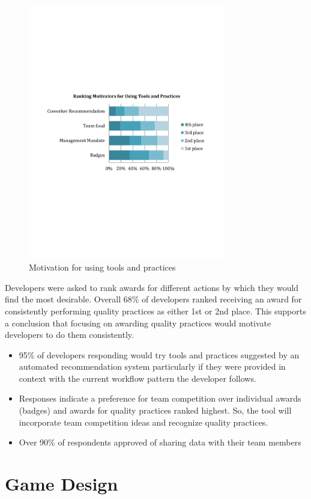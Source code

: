 \documentclass{sig-alternate}
\begin{document}
\begin{figure}
	\includegraphics[width=3.4in]{ToolAndPracticeMotivators.pdf}
	\caption{Motivation for using tools and practices}
	\label{fig:toolandpracticemotivators}
\end{figure}

Developers were asked to rank awards for different actions by which they would find the most desirable.  Overall 68\% of developers ranked receiving an award for consistently performing quality practices as either 1st or 2nd place.  This supports a conclusion that focusing on awarding quality practices would motivate developers to do them consistently.
\begin{itemize}
\item 95\% of developers responding would try tools and practices suggested by an automated recommendation system particularly if they were provided in context with the current workflow pattern the developer follows.
\item Responses indicate a preference for team competition over individual awards (badges) and awards for quality practices ranked highest.  So, the tool will incorporate team competition ideas and recognize quality practices.
\item Over 90\% of respondents approved of sharing data with their team members
\end{itemize}



\section{Game Design}
\end{document}
